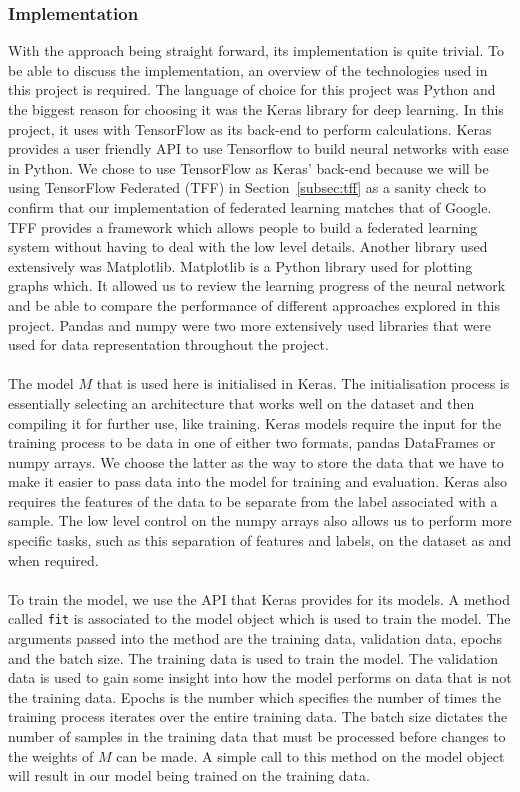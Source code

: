 \documentclass[12pt]{article}
\begin{document}
\subsubsection{Implementation}
With the approach being straight forward, its implementation is quite trivial. To be able to discuss the implementation, an overview of the technologies used in this project is required. The language of choice for this project was Python and the biggest reason for choosing it was the Keras library for deep learning. In this project, it uses with TensorFlow as its back-end to perform calculations. Keras provides a user friendly API to use Tensorflow to build neural networks with ease in Python. We chose to use TensorFlow as Keras' back-end because we will be using TensorFlow Federated (TFF) in Section~\ref{subsec:tff} as a sanity check to confirm that our implementation of federated learning matches that of Google. TFF provides a framework which allows people to build a federated learning system without having to deal with the low level details. Another library used extensively was Matplotlib. Matplotlib is a Python library used for plotting graphs which. It allowed us to review the learning progress of the neural network and be able to compare the performance of different approaches explored in this project. Pandas and numpy were two more extensively used libraries that were used for data representation throughout the project.
\\\\
The model $M$ that is used here is initialised in Keras. The initialisation process is essentially selecting an architecture that works well on the dataset and then compiling it for further use, like training. Keras models require the input for the training process to be data in one of either two formats, pandas DataFrames or numpy arrays. We choose the latter as the way to store the data that we have to make it easier to pass data into the model for training and evaluation. Keras also requires the features of the data to be separate from the label associated with a sample. The low level control on the numpy arrays also allows us to perform more specific tasks, such as this separation of features and labels, on the dataset as and when required.
\\\\
To train the model, we use the API that Keras provides for its models. A method called \texttt{fit} is associated to the model object which is used to train the model. The arguments passed into the method are the training data, validation data, epochs and the batch size. The training data is used to train the model. The validation data is used to gain some insight into how the model performs on data that is not the training data. Epochs is the number which specifies the number of times the training process iterates over the entire training data. The batch size dictates the number of samples in the training data that must be processed before changes to the weights of $M$ can be made. A simple call to this method on the model object will result in our model being trained on the training data.
\end{document}
